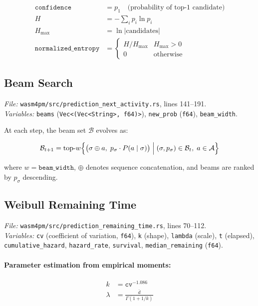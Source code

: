 \documentclass[11pt,a4paper]{article}
\begin{document}
\begin{align}
  \texttt{confidence} &= p_1 \quad\text{(probability of top-1 candidate)} \\[4pt]
  H &= -\sum_{i} p_i \ln p_i \\[4pt]
  H_\text{max} &= \ln |\text{candidates}| \\[4pt]
  \texttt{normalized\_entropy} &=
  \begin{cases}
    H / H_\text{max} & H_\text{max} > 0 \\
    0 & \text{otherwise}
  \end{cases}
\end{align}

\subsection{Beam Search}
\textit{File:} \texttt{wasm4pm/src/prediction\_next\_activity.rs}, lines 141--191.\\
\textit{Variables:} \texttt{beams} (\texttt{Vec<(Vec<String>, f64)>}), \texttt{new\_prob} (\texttt{f64}), \texttt{beam\_width}.

At each step, the beam set $\mathcal{B}$ evolves as:

\begin{equation}
  \mathcal{B}_{t+1} = \text{top-}w\Bigl\{
    \bigl(\sigma \oplus a,\; p_\sigma \cdot P(a \mid \sigma)\bigr)
    \;\Big|\;
    (\sigma, p_\sigma) \in \mathcal{B}_t,\; a \in \mathcal{A}
  \Bigr\}
\end{equation}

where $w = \texttt{beam\_width}$, $\oplus$ denotes sequence concatenation, and beams are ranked by $p_\sigma$ descending.

\subsection{Weibull Remaining Time}
\textit{File:} \texttt{wasm4pm/src/prediction\_remaining\_time.rs}, lines 70--112.\\
\textit{Variables:} \texttt{cv} (coefficient of variation, \texttt{f64}), \texttt{k} (shape), \texttt{lambda} (scale), \texttt{t} (elapsed), \texttt{cumulative\_hazard}, \texttt{hazard\_rate}, \texttt{survival}, \texttt{median\_remaining} (\texttt{f64}).

\paragraph{Parameter estimation from empirical moments:}
\begin{align}
  k &= \texttt{cv}^{-1.086} \\[4pt]
  \lambda &= \frac{\bar{d}}{\Gamma(1 + 1/k)}
\end{align}
\end{document}
